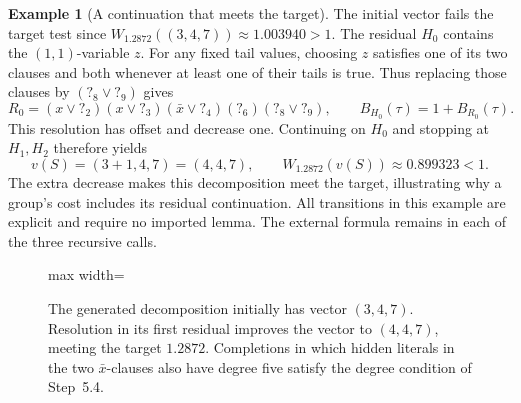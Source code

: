 \documentclass[10pt,twoside]{article}
\newcommand{\tail}[1]{\mathord{?}_{#1}}
\theoremstyle{definition}
\newtheorem{example}{Example}
\theoremstyle{remark}
\begin{document}
\begin{example}[A continuation that meets the target]
The initial vector fails the target test since
$W_{1.2872}((3,4,7))\approx1.003940>1$.
The residual $H_0$ contains the $(1,1)$-variable $z$. For any fixed
tail values, choosing $z$ satisfies one of its two clauses and both whenever
at least one of their tails is true. Thus replacing those clauses by
$(\tail{8}\vee\tail{9})$ gives
\[
 R_0=(x\vee\tail{2})(x\vee\tail{3})(\bar x\vee\tail{4})
     (\tail{6})(\tail{8}\vee\tail{9}),
 \qquad B_{H_0}(\tau)=1+B_{R_0}(\tau).
\]
This resolution has offset and decrease one. Continuing on $H_0$ and
stopping at $H_1,H_2$ therefore yields
\[
 v(S)=(3+1,4,7)=(4,4,7),\qquad
 W_{1.2872}(v(S))\approx0.899323<1.
\]
The extra decrease makes this decomposition meet the target, illustrating
why a group's cost includes its residual continuation. All transitions in
this example are explicit and require no imported lemma. The external
formula remains in each of the three recursive calls.
\end{example}

\begin{figure}[!htbp]
\centering
\begin{adjustbox}{max width=\linewidth}
\end{adjustbox}
\caption{The generated decomposition initially has vector $(3,4,7)$.
Resolution in its first residual improves the vector to $(4,4,7)$, meeting
the target $1.2872$. Completions in which hidden literals in the two
$\bar x$-clauses also have degree five satisfy the degree condition of Step~5.4.}
\label{fig:example}
\end{figure}
\end{document}
